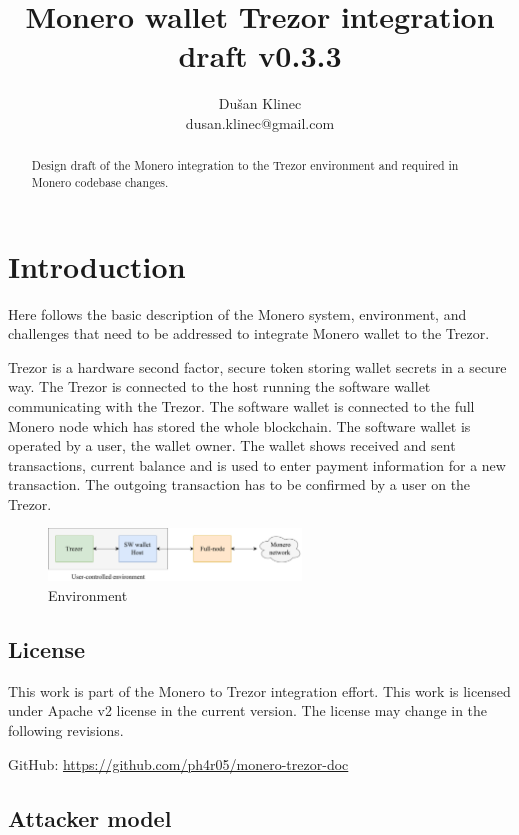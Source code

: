 \documentclass[]{article}
\title{Monero wallet Trezor integration draft v0.3.3}
\author{Du\v{s}an Klinec \\{dusan.klinec@gmail.com}}
\begin{document}
	
\maketitle

\begin{abstract}
	Design draft of the Monero integration to the Trezor environment and required in Monero codebase changes.
\end{abstract}

\section{Introduction}
Here follows the basic description of the Monero system, environment, and challenges that need to be addressed to integrate Monero wallet to the Trezor.

Trezor is a hardware second factor, secure token storing wallet secrets in a secure way. 
The Trezor is connected to the host running the software wallet communicating with the Trezor. The software wallet is connected to the full Monero node which has stored the whole blockchain. The software wallet is operated by a user, the wallet owner. The wallet shows received and sent transactions, current balance and is used to enter payment information for a new transaction. The outgoing transaction has to be confirmed by a user on the Trezor.

\begin{figure}[h]
	\centering
	\includegraphics[width=0.6\textwidth, angle=0]{img/trezord.pdf}
	\caption{Environment}
\end{figure}


\subsection{License}
This work is part of the Monero to Trezor integration effort. This work is licensed under Apache v2 license in the current version. The license may change in the following revisions.

GitHub: \url{https://github.com/ph4r05/monero-trezor-doc} 

\subsection{Attacker model}
\end{document}

